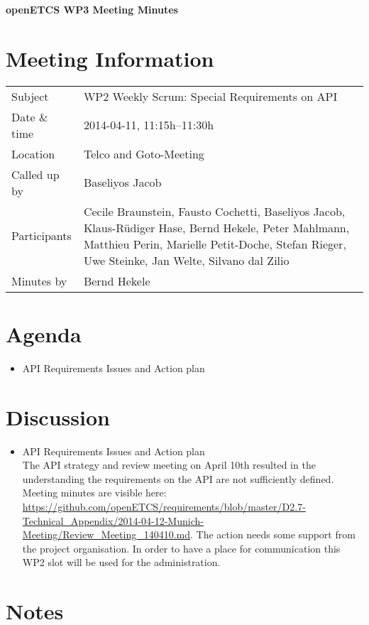 \documentclass[a4paper, 11pt]{article}
\begin{document}
{\begin{center}\huge\bf openETCS WP3 Meeting Minutes\end{center}}
\section{Meeting Information}

\renewcommand{\arraystretch}{1.5}
\begin{supertabular}{m{.2\textwidth}m{.8\textwidth}}
Subject & WP2 Weekly Scrum: Special Requirements on API\\
Date \& time & 2014-04-11, 11:15h--11:30h\\
Location & Telco and Goto-Meeting\\
Called up by & Baseliyos Jacob\\
Participants &
Cecile Braunstein,
Fausto Cochetti,
Baseliyos Jacob,
Klaus-R\"udiger Hase,
Bernd Hekele,
Peter Mahlmann,
Matthieu Perin,
Marielle Petit-Doche,
Stefan Rieger,
Uwe Steinke,
Jan Welte,
Silvano dal Zilio
\\

Minutes by & Bernd Hekele\\
\end{supertabular}
\renewcommand{\arraystretch}{1.0}


\section{{Agenda}}
\begin{itemize}
\item API Requirements Issues and Action plan\\

\end{itemize}

\section{Discussion}
\begin{itemize}

\item API Requirements Issues and Action plan\\
The API strategy and review meeting on April 10th resulted in the understanding the requirements on the API are not sufficiently defined. Meeting minutes are visible here: \url{https://github.com/openETCS/requirements/blob/master/D2.7-Technical_Appendix/2014-04-12-Munich-Meeting/Review_Meeting_140410.md}. The action needs some support from the project organisation. In order to have a place for communication this WP2 slot will be used for the administration.

\end{itemize}

\section{Notes}
\end{document}
